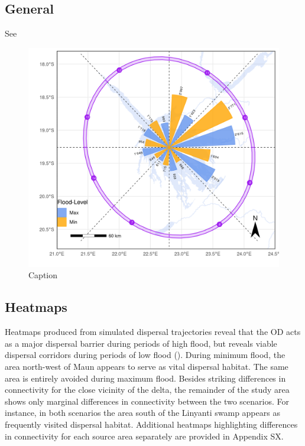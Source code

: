 \documentclass[abstract=on,10pt,a4paper,bibliography=totocnumbered]{article}
\begin{document}
\subsection{General}
See 
\begin{figure}
  \begin{center}
  \includegraphics[width = \textwidth]{99_Emigration.png}
  \caption{Caption}
  \label{Emigration}
  \end{center}
\end{figure}

\subsection{Heatmaps}
Heatmaps produced from simulated dispersal trajectories reveal that the OD acts
as a major dispersal barrier during periods of high flood, but reveals viable
dispersal corridors during periods of low flood (). During
minimum flood, the area north-west of Maun appears to serve as vital dispersal
habitat. The same area is entirely avoided during maximum flood. Besides
striking differences in connectivity for the close vicinity of the delta, the
remainder of the study area shows only marginal differences in connectivity
between the two scenarios. For instance, in both scenarios the area south of the
Linyanti swamp appears as frequently visited dispersal habitat. Additional
heatmaps highlighting differences in connectivity for each source area
separately are provided in Appendix SX.
\end{document}
